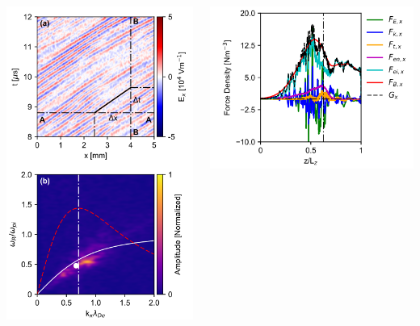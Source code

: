 \documentclass[sans, aspectratio=169]{beamer}
\begin{document}
\begin{frame}
	\begin{columns}
		\begin{column}{0.5\linewidth}
		\centering
		\includegraphics[width=0.8\linewidth]{proposition_from_students/I_love_Charoy.png} 
		\end{column}
		\vline
		\begin{column}{0.5\linewidth}
		\centering
		\includegraphics[width=0.8\linewidth]{proposition_from_students/I_hate_charoy.png} 
		\end{column}
	\end{columns}
	
\end{frame}
\end{document}
